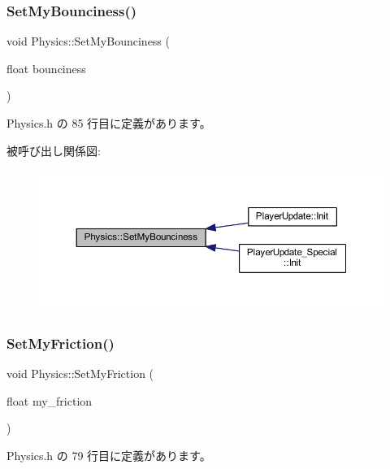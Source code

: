 \subsubsection{\texorpdfstring{Set\+My\+Bounciness()}{SetMyBounciness()}}
{\footnotesize\ttfamily void Physics\+::\+Set\+My\+Bounciness (\begin{DoxyParamCaption}\item[{float}]{bounciness }\end{DoxyParamCaption})\hspace{0.3cm}{\ttfamily [inline]}}



 Physics.\+h の 85 行目に定義があります。

被呼び出し関係図\+:\nopagebreak
\begin{figure}[H]
\begin{center}
\leavevmode
\includegraphics[width=350pt]{class_physics_a662185709961c64615c51ac5f32ab2ff_icgraph}
\end{center}
\end{figure}
\mbox{\label{class_physics_a0e3c9825aa4129a2212c1c61d0cd6ecb}} 
\subsubsection{\texorpdfstring{Set\+My\+Friction()}{SetMyFriction()}}
{\footnotesize\ttfamily void Physics\+::\+Set\+My\+Friction (\begin{DoxyParamCaption}\item[{float}]{my\+\_\+friction }\end{DoxyParamCaption})\hspace{0.3cm}{\ttfamily [inline]}}



 Physics.\+h の 79 行目に定義があります。

